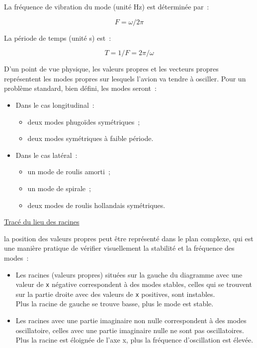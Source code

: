 \documentclass[a4paper,twoside,12pt,dvips]{article}
\begin{document}
La fréquence de vibration du mode (unité Hz) est déterminée par~:

$$F = \omega / 2 \pi $$

La période de temps (unité s) est~:

$$T = 1 / F = 2 \pi / \omega $$

D’un point de vue physique, les valeurs propres et les vecteurs propres
représentent les modes propres sur lesquels l’avion va tendre à osciller.
Pour un problème standard, bien défini, les modes seront~:

\begin{itemize}
	\item Dans le cas longitudinal~:
	\begin{itemize}
		\item deux modes phugoïdes symétriques~;
		\item deux modes symétriques à faible période.
	\end{itemize}
	\item Dans le cas latéral~:
	\begin{itemize}
		\item un mode de roulis amorti~;
		\item un mode de spirale~;
		\item deux modes de roulis hollandais symétriques.
	\end{itemize}
\end{itemize}

\underline{Tracé du lieu des racines}

la position des valeurs propres peut être représenté dans le plan complexe, qui est une manière pratique de vérifier visuellement la stabilité et la fréquence des modes~:

\begin{itemize}
	\item Les racines (valeurs propres) situées sur la gauche du diagramme avec
	une valeur de \texttt{x} négative correspondent à des modes stables, celles
	qui se trouvent sur la partie droite avec des valeurs de \texttt{x} 
	positives, sont instables.\\
	Plus la racine de gauche se trouve basse, plus le mode est stable.
	\item Les racines avec une partie imaginaire non nulle correspondent à des 
	modes oscillatoire, celles avec une partie imaginaire nulle ne sont pas
	oscillatoires.\\
	Plus la racine est éloignée de l’axe x, plus la fréquence d’oscillation est
	élevée.
\end{itemize}
\end{document}
